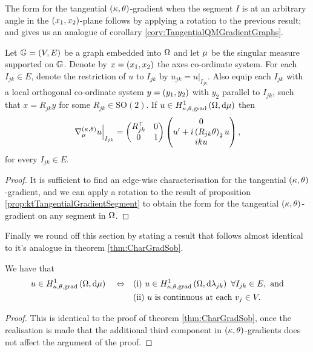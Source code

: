 The form for the tangential $\left( \kappa, \theta \right)$-gradient when the segment $I$ is at an arbitrary angle in the $\left( x_1,x_2 \right)$-plane follows by applying a rotation to the previous result; and gives us an analogue of corollary \ref{cory:TangentialQMGradientGraphs}.
\begin{cory} \label{cory:ktTangentialGradientForm}
	Let $\mathbb{G}=\left( V,E \right)$ be a graph embedded into $\Omega$ and let $\mu$ be the singular measure supported on $\mathbb{G}$.
	Denote by $x=\left( x_1,x_2 \right)$ the axes co-ordinate system.
	For each $I_{jk}\in E$, denote the restriction of $u$ to $I_{jk}$ by $u_{jk} = u\vert_{I_{jk}}$.
	Also equip each $I_{jk}$ with a local orthogonal co-ordinate system $y=\left( y_1,y_2 \right)$ with $y_2$ parallel to $I_{jk}$, such that $x=R_{jk}y$ for some $R_{jk}\in\mathrm{SO}(2)$.
	If $u\in H^1_{\kappa,\theta,\mathrm{grad}}\left( \Omega, \mathrm{d}\mu \right)$ then
	\begin{align*}
		\left.\nabla^{\left( \kappa, \theta \right)}_{\mu}u\right\vert_{I_{jk}} = \begin{pmatrix} R_{jk}^\top & 0 \\ 0 & 1 \end{pmatrix} \begin{pmatrix} 0 \\ u' + i\left( R_{jk}\theta \right)_2 u \\ iku \end{pmatrix},
	\end{align*}
	for every $I_{jk}\in E$.
\end{cory}
\begin{proof}
	It is sufficient to find an edge-wise characterisation for the tangential $\left( \kappa, \theta \right)$-gradient, and we can apply a rotation to the result of proposition \ref{prop:ktTangentialGradientSegment} to obtain the form for the tangential $\left( \kappa, \theta \right)$-gradient on any segment in $\Omega$.
\end{proof}

Finally we round off this section by stating a result that follows almost identical to it's analogue in theorem \ref{thm:CharGradSob}.
\begin{theorem} \label{thm:ktGradSobChar}
	We have that
	\begin{align*}
		u\in\ktgradSob{\ddom}{\ddmes} \quad \Leftrightarrow 
		&\quad\text{(i)} \ u\in\ktgradSob{\ddom}{\lambda_{jk}} \ \forall I_{jk}\in E, \text{ and}\\
		&\quad\text{(ii)} \ u \text{ is continuous at each } v_j\in V.
	\end{align*}
\end{theorem}
\begin{proof}
	This is identical to the proof of theorem \ref{thm:CharGradSob}, once the realisation is made that the additional third component in $\left( \kappa, \theta \right)$-gradients does not affect the argument of the proof.
\end{proof}

